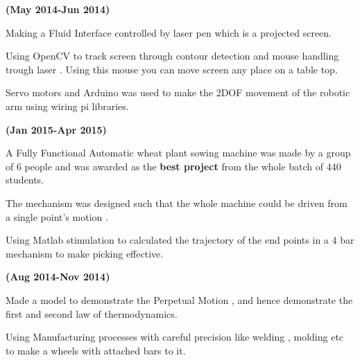 \documentclass[letterpaper]{deedy-resume} %
\begin{document}
\microspace
{}
\hfill {\textbf{(May 2014-Jun 2014)}}\\

\begin{tightitemize}
\item Making a Fluid Interface controlled by laser pen which is a projected screen.
\item Using OpenCV to track screen through contour detection and mouse handling trough laser . Using this mouse you can move screen any place on a table top.
\item Servo motors and Arduino was used to make the 2DOF movement of the robotic arm using wiring pi libraries.
\end{tightitemize}

\microspace

\hfill {\textbf{(Jan 2015-Apr 2015)}}\\
\begin{tightitemize}
\item A Fully Functional Automatic wheat plant sowing machine was made by a group of 6 people and was awarded as the \textbf{best project} from the whole batch of 440 students.
\item The mechanism was designed such that the whole machine could be driven from a single point's motion .
\item Using Matlab stimulation to calculated the trajectory of the end points in a 4 bar mechanism to make picking effective.
\end{tightitemize}

\microspace

\hfill {\textbf{(Aug 2014-Nov 2014)}}\\
\begin{tightitemize}
\item Made a model to demonstrate the Perpetual Motion , and hence demonstrate the first and second law of thermodynamics.
\item Using Manufacturing processes with careful precision like welding , molding etc to make a wheels with attached bars to it.
\end{tightitemize}
\end{document}
